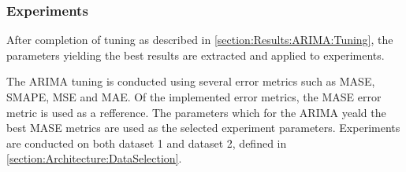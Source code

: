 \subsubsection{Experiments}

After completion of tuning as described in \cref{section:Results:ARIMA:Tuning},
the parameters yielding the best results are extracted and applied to experiments.

The ARIMA tuning is conducted using several error metrics such as MASE, SMAPE, MSE and MAE.
Of the implemented error metrics, the MASE error metric is used as a refference.
The parameters which for the ARIMA yeald the best MASE metrics are used as the selected experiment parameters.
Experiments are conducted on both dataset 1 and dataset 2, defined in \cref{section:Architecture:DataSelection}.

